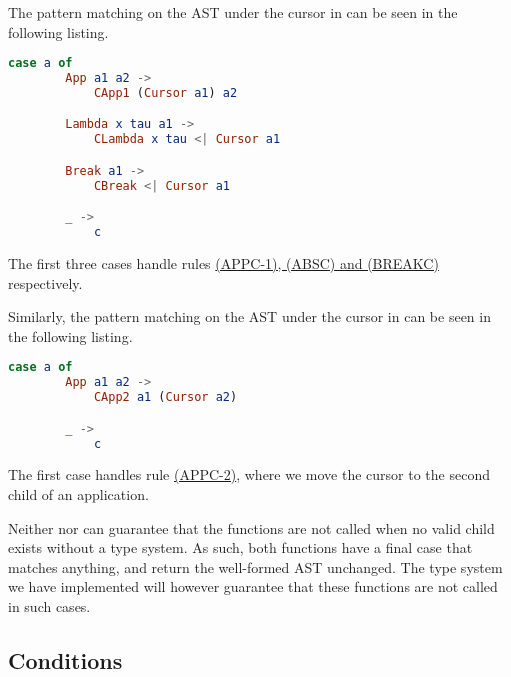 The pattern matching on the AST under the cursor in  can be seen
in the following listing.

\begin{lstlisting}[language=elm,%
                   label="interesting-childOne-cases",%
                   gobble=4,%
                   ]
    case a of
        App a1 a2 ->
            CApp1 (Cursor a1) a2

        Lambda x tau a1 ->
            CLambda x tau <| Cursor a1

        Break a1 ->
            CBreak <| Cursor a1

        _ ->
            c
\end{lstlisting}

The first three cases handle rules \hyperref[fig:cursorreductionrules]{(APPC-1),
(ABSC) and (BREAKC)} respectively.

Similarly, the pattern matching on the AST under the cursor in 
can be seen in the following listing.

\begin{lstlisting}[language=elm,%
                   label="interesting-childTwo-cases",%
                   gobble=4,%
                   ]
    case a of
        App a1 a2 ->
            CApp2 a1 (Cursor a2)

        _ ->
            c
\end{lstlisting}


The first case handles rule \hyperref[fig:cursorreductionrules]{(APPC-2)}, where
we move the cursor to the second child of an application.

Neither  nor  can guarantee that the functions are
not called when no valid child exists without a type system. As such, both
functions have a final case that matches anything, and return the well-formed
AST unchanged. The type system we have implemented will however guarantee that
these functions are not called in such cases.

\subsection{Conditions}

